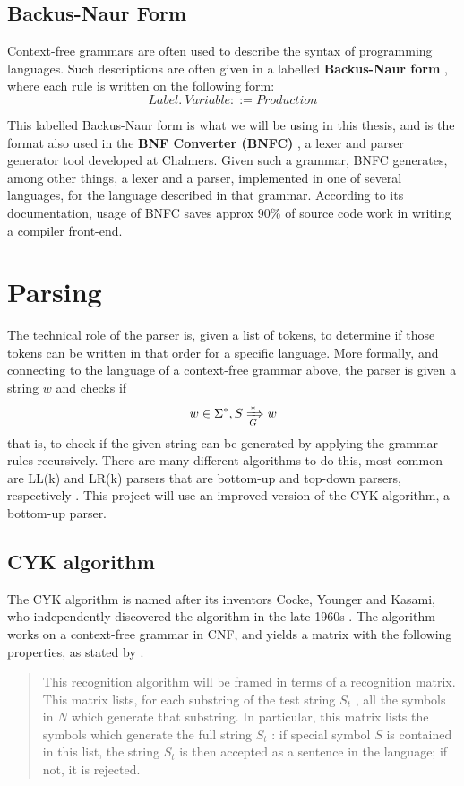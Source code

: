 \documentclass[a4paper,12pt,notitlepage]{report}
\renewcommand\cite{\citep}
\begin{document}
\subsection{Backus-Naur Form}
Context-free grammars are often used to describe the syntax of programming
languages. Such descriptions are often given in a labelled \textbf{Backus-Naur
form} \cite{backusform}, where each rule is written on the following form:
\[
Label.\ Variable ::= Production 
\]

This labelled Backus-Naur form is what we will be using in this thesis, and is
the format also used in the \textbf{BNF Converter (BNFC)} \cite{bnfc}, a lexer
and parser generator tool developed at Chalmers.  Given such a grammar, BNFC
generates, among other things, a lexer and a parser, implemented in one of
several languages, for the language described in that grammar. According to its
documentation, usage of BNFC saves approx 90\% of source code work in writing a
compiler front-end. 

\section{Parsing}
\label{parsingsection}
The technical role of the parser is, given a list of tokens, to determine if
those tokens can be written in that order for a specific language. More
formally, and connecting to the language of a context-free grammar above, the
parser is given a string $w$ and checks if 
\[
w \in \Sigma^*, S \xRightarrow[G]{*} w
\]
that is, to check if the given string can be generated by applying the grammar
rules recursively. There are many different algorithms to do this, most common
are LL(k) and LR(k) parsers that are bottom-up and top-down parsers,
respectively \cite[p.192]{dragonbook}. This project will use an improved version
of the CYK algorithm, a bottom-up parser.

\subsection{CYK algorithm}
The CYK algorithm is named after its inventors Cocke, Younger and Kasami, who
independently discovered the algorithm in the late 1960s \cite{Younger67}. The
algorithm works on a context-free grammar in CNF, and yields a matrix with the
following properties, as stated by \citet{Younger67}.

\begin{quote}
This recognition algorithm will be framed in terms of a recognition
matrix. This matrix lists, for each substring of the test string $S_t$ , all
the symbols in $N$ which generate that substring. In particular, this
matrix lists the symbols which generate the full string $S_t$ : if special
symbol $S$ is contained in this list, the string $S_t$ is then accepted as a
sentence in the language; if not, it is rejected.
\end{quote}
\end{document}
